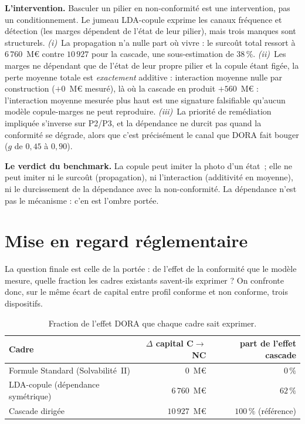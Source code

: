\textbf{L'intervention.} Basculer un pilier en non-conformité est une intervention, pas un
conditionnement. Le jumeau LDA-copule exprime les canaux fréquence et détection (les marges
dépendent de l'état de leur pilier), mais trois manques sont structurels.
\emph{(i)}~La propagation n'a nulle part où vivre : le surcoût total ressort à
$6\,760$~M\euro{} contre $10\,927$ pour la cascade, une sous-estimation de $38\,\%$.
\emph{(ii)}~Les marges ne dépendant que de l'état de leur propre pilier et la copule étant
figée, la perte moyenne totale est \emph{exactement} additive : interaction moyenne nulle
par construction ($+0$~M\euro{} mesuré), là où la cascade en produit $+560$~M\euro{} :
l'interaction moyenne mesurée plus haut est une signature falsifiable qu'aucun modèle
copule-marges ne peut reproduire. \emph{(iii)}~La priorité de remédiation impliquée
s'inverse sur P2/P3, et la dépendance ne durcit pas quand la conformité se dégrade, alors
que c'est précisément le canal que DORA fait bouger ($g$ de $0{,}45$ à $0{,}90$).

\begin{cle}
\textbf{Le verdict du benchmark.} La copule peut imiter la photo d'un état~; elle ne
peut imiter ni le surcoût (propagation), ni l'interaction (additivité en moyenne), ni le
durcissement de la dépendance avec la non-conformité. La dépendance n'est pas le
mécanisme : c'en est l'ombre portée.
\end{cle}

\section{Mise en regard réglementaire}

La question finale est celle de la portée : de l'effet de la conformité que le modèle
mesure, quelle fraction les cadres existants savent-ils exprimer ? On confronte donc, sur
le même écart de capital entre profil conforme et non conforme, trois dispositifs.

\begin{table}[H]\centering\small
\renewcommand{\arraystretch}{1.25}
\begin{tabular}{@{}l r r@{}}
\toprule
\textbf{Cadre} & \textbf{$\Delta$ capital C$\to$NC} & \textbf{part de l'effet cascade} \\
\midrule
Formule Standard (Solvabilité~II) & $0$~M\euro{} & $0\,\%$ \\
LDA-copule (dépendance symétrique) & $6\,760$~M\euro{} & $62\,\%$ \\
Cascade dirigée & $10\,927$~M\euro{} & $100\,\%$ (référence) \\
\bottomrule
\end{tabular}
\caption{Fraction de l'effet DORA que chaque cadre sait exprimer.}
\end{table}


